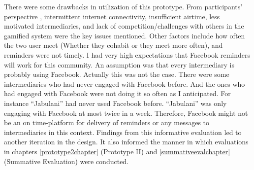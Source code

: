 There were some drawbacks in utilization of this prototype. From participants' perspective , intermittent internet connectivity, insufficient airtime, less motivated intermediaries, and lack of competition/challenges with others in the gamified system were the key issues mentioned. Other factors include how often the two user meet (Whether they cohabit or they meet more often), and reminders were not timely. I had very high expectations that Facebook reminders will work for this community. An assumption was that every intermediary is probably using Facebook. Actually this was not the case. There were some intermediaries who had never engaged with Facebook before. And the ones who had engaged with Facebook were not doing it so often as I anticipated. For instance ``Jabulani'' had never used Facebook before. ``Jabulani'' was only engaging with Facebook at most twice in a week. Therefore, Facebook might not be an on time-platform for delivery of reminders or any messages to intermediaries in this context. Findings from this informative evaluation led to another iteration in the design. It also informed the manner in which evaluations in chapters \ref{prototype2chapter} (Prototype II) and \ref{summativeevalchapter} (Summative Evaluation) were conducted.

